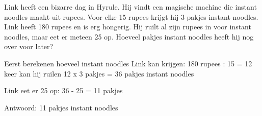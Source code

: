 \begin{opgave}
Link heeft een bizarre dag in Hyrule. Hij vindt een magische machine die 
instant noodles maakt uit rupees. Voor elke 15 rupees krijgt hij 3 pakjes 
instant noodles. Link heeft 180 rupees en is erg hongerig. Hij ruilt al zijn 
rupees in voor instant noodles, maar eet er meteen 25 op. Hoeveel pakjes 
instant noodles heeft hij nog over voor later?
\end{opgave}

\begin{oplossing}
Eerst berekenen hoeveel instant noodles Link kan krijgen:
180 rupees : 15 = 12 keer kan hij ruilen
12 x 3 pakjes = 36 pakjes instant noodles

Link eet er 25 op:
36 - 25 = 11 pakjes

Antwoord: 11 pakjes instant noodles
\end{oplossing}